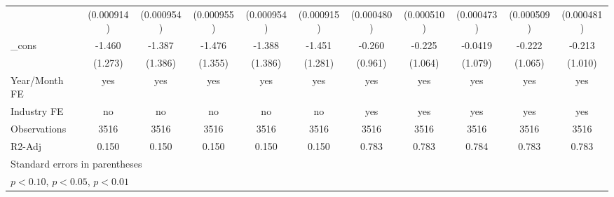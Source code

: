 \begin{table}[htbp]
\begin{tabular}{l*{10}{c}}
                &(0.000914)         &(0.000954)         &(0.000955)         &(0.000954)         &(0.000915)         &(0.000480)         &(0.000510)         &(0.000473)         &(0.000509)         &(0.000481)         \\
\_cons          &   -1.460         &   -1.387         &   -1.476         &   -1.388         &   -1.451         &   -0.260         &   -0.225         &  -0.0419         &   -0.222         &   -0.213         \\
                &  (1.273)         &  (1.386)         &  (1.355)         &  (1.386)         &  (1.281)         &  (0.961)         &  (1.064)         &  (1.079)         &  (1.065)         &  (1.010)         \\
\hline
Year/Month FE   &      yes         &      yes         &      yes         &      yes         &      yes         &      yes         &      yes         &      yes         &      yes         &      yes         \\
Industry FE     &       no         &       no         &       no         &       no         &       no         &      yes         &      yes         &      yes         &      yes         &      yes         \\
Observations    &     3516         &     3516         &     3516         &     3516         &     3516         &     3516         &     3516         &     3516         &     3516         &     3516         \\
R2-Adj          &    0.150         &    0.150         &    0.150         &    0.150         &    0.150         &    0.783         &    0.783         &    0.784         &    0.783         &    0.783         \\
\hline\hline
\multicolumn{11}{l}{\footnotesize Standard errors in parentheses}\\
\multicolumn{11}{l}{\footnotesize \sym{*} \(p<0.10\), \sym{**} \(p<0.05\), \sym{***} \(p<0.01\)}\\
\end{tabular}
\end{table}
